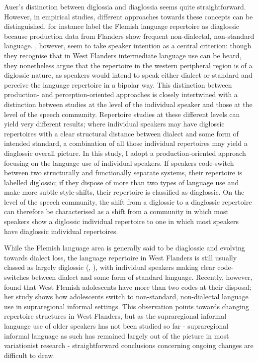 \documentclass[output=paper]{LSP/langsci}
\begin{document}
Auer’s distinction between diglossia and diaglossia seems quite straightforward. However, in empirical studies, different approaches towards these concepts can be distinguished. \citet{rys_fonologische_2007} for instance label the Flemish language repertoire as diaglossic because production data from Flanders show frequent non-dialectal, non-standard language. \citet{willemyns_diglossie_2008}, however, seem to take speaker intention as a central criterion: though they recognise that in West Flanders intermediate language use can be heard, they nonetheless argue that the repertoire in the western peripheral region is of a diglossic nature, as speakers would intend to speak either dialect or standard and perceive the language repertoire in a bipolar way. This distinction between production- and perception-oriented approaches is closely intertwined with a distinction between studies at the level of the individual speaker and those at the level of the speech community. Repertoire studies at these different levels can yield very different results; where individual speakers may have diglossic repertoires with a clear structural distance between dialect and some form of intended standard, a combination of all those individual repertoires may yield a diaglossic overall picture. In this study, I adopt a production-oriented approach focusing on the language use of individual speakers. If speakers code-switch between two structurally and functionally separate systems, their repertoire is labelled diglossic; if they dispose of more than two types of language use and make more subtle style-shifts, their repertoire is classified as diaglossic. On the level of the speech community, the shift from a diglossic to a diaglossic repertoire can therefore be characterised as a shift from a community in which most speakers show a diglossic individual repertoire to one in which most speakers have diaglossic individual repertoires. 

While the Flemish language area is generally said to be diaglossic and evolving towards dialect loss, the language repertoire in West Flanders is still usually classed as largely diglossic (\citealt{de_caluwe_tussentaal_2009}, \citealt{willemyns_diglossie_2008}), with individual speakers making clear code-switches between dialect and some form of standard language. Recently, however, \citet{gabel_taalaccommodatie_2010} found that West Flemish adolescents have more than two codes at their disposal; her study shows how adolescents switch to non-standard, non-dialectal language use in supraregional informal settings. This observation points towards changing repertoire structures in West Flanders, but as the supraregional informal language use of older speakers has not been studied so far - supraregional informal language as such has remained largely out of the picture in most variationist research - straightforward conclusions concerning ongoing changes are difficult to draw.
\end{document}

